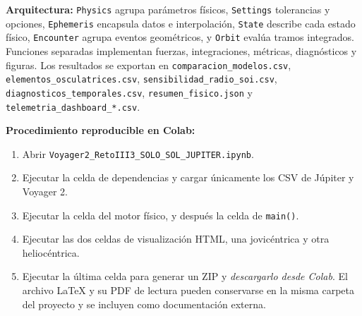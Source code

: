 \documentclass[11pt,a4paper]{article}
\begin{document}
\textbf{Arquitectura:} \texttt{Physics} agrupa parámetros físicos, \texttt{Settings} tolerancias y opciones, \texttt{Ephemeris} encapsula datos e interpolación, \texttt{State} describe cada estado físico, \texttt{Encounter} agrupa eventos geométricos, y \texttt{Orbit} evalúa tramos integrados. Funciones separadas implementan fuerzas, integraciones, métricas, diagnósticos y figuras. Los resultados se exportan en \texttt{comparacion\_modelos.csv}, \texttt{elementos\_osculatrices.csv}, \texttt{sensibilidad\_radio\_soi.csv}, \texttt{diagnosticos\_temporales.csv}, \texttt{resumen\_fisico.json} y \texttt{telemetria\_dashboard\_*.csv}.

\textbf{Procedimiento reproducible en Colab:}
\begin{enumerate}
\item Abrir \texttt{Voyager2\_RetoIII3\_SOLO\_SOL\_JUPITER.ipynb}.
\item Ejecutar la celda de dependencias y cargar únicamente los CSV de Júpiter y Voyager 2.
\item Ejecutar la celda del motor físico, y después la celda de \texttt{main()}.
\item Ejecutar las dos celdas de visualización HTML, una jovicéntrica y otra heliocéntrica.
\item Ejecutar la última celda para generar un ZIP y \emph{descargarlo desde Colab}. El archivo LaTeX y su PDF de lectura pueden conservarse en la misma carpeta del proyecto y se incluyen como documentación externa.
\end{enumerate}
\end{document}
